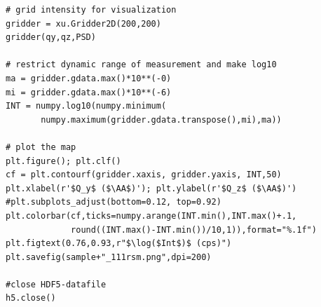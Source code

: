 \begin{lstlisting}[caption={reading a spec-file, saving it to HDF5, reading a particular scan, convert it to reciprocal space, plot it using matplotlib}]
# grid intensity for visualization
gridder = xu.Gridder2D(200,200)
gridder(qy,qz,PSD)

# restrict dynamic range of measurement and make log10
ma = gridder.gdata.max()*10**(-0)
mi = gridder.gdata.max()*10**(-6)
INT = numpy.log10(numpy.minimum(
       numpy.maximum(gridder.gdata.transpose(),mi),ma))

# plot the map
plt.figure(); plt.clf()
cf = plt.contourf(gridder.xaxis, gridder.yaxis, INT,50)
plt.xlabel(r'$Q_y$ ($\AA$)'); plt.ylabel(r'$Q_z$ ($\AA$)')
#plt.subplots_adjust(bottom=0.12, top=0.92)
plt.colorbar(cf,ticks=numpy.arange(INT.min(),INT.max()+.1,
             round((INT.max()-INT.min())/10,1)),format="%.1f")
plt.figtext(0.76,0.93,r"$\log($Int$)$ (cps)") 
plt.savefig(sample+"_111rsm.png",dpi=200)

#close HDF5-datafile
h5.close()
\end{lstlisting}
